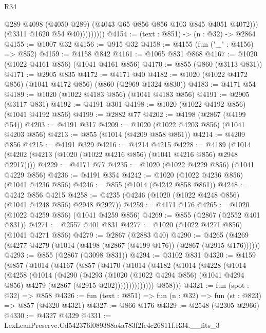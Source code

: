 \begin{lexlean}{R34}
\begin{coremodule}
                        @289
                        @4098
                        (@4050 @289)
                        (@4043 @65 @856 @856 @103 @845 @4051 @4072)))
                    (@3311 @1620 @54 @40)))))))))
@4154 := (text : @851) -> (n : @32) -> @2864
@4155 := @1007 @32
@4156 := @915 @32
@4158 := @4155 (fun ("_" : @4156) => @852)
@4159 := @4158 @842
@4161 := @1065 @831 @868
@4167 := @1020 (@1022 @4161 @856) (@1041 @4161 @856)
@4170 := @855 (@860 (@3113 @831))
@4171 := @2905 @835
@4172 := @4171 @40
@4182 := @1020 (@1022 @4172 @856) (@1041 @4172 @856) (@860 (@2969 @1324 @830))
@4183 := @4171 @54
@4189 := @1020 (@1022 @4183 @856) (@1041 @4183 @856)
@4191 := @2905 (@3117 @831)
@4192 := @4191 @301
@4198 := @1020 (@1022 @4192 @856) (@1041 @4192 @856)
@4199 := @2882 @77
@4202 := @4198 (@2867 (@4199 @54))
@4203 := @4191 @317
@4209 := @1020 (@1022 @4203 @856) (@1041 @4203 @856)
@4213 := @855 (@1014 (@4209 @858 @861))
@4214 := @4209 @856
@4215 := @4191 @329
@4216 := @4214 @4215
@4228 := @4189 (@1014 (@4202 (@4213 (@1020 (@1022 @4216 @856) (@1041 @4216 @856) @2948 @2917))))
@4229 := @4171 @77
@4235 := @1020 (@1022 @4229 @856) (@1041 @4229 @856)
@4236 := @4191 @354
@4242 := @1020 (@1022 @4236 @856) (@1041 @4236 @856)
@4246 := @855 (@1014 (@4242 @858 @861))
@4248 := @4242 @856 @4215
@4258 := @4235 (@4246 (@1020 (@1022 @4248 @856) (@1041 @4248 @856) @2948 @2927))
@4259 := @4171 @176
@4265 := @1020 (@1022 @4259 @856) (@1041 @4259 @856)
@4269 := @855 (@2867 (@2552 @401 @831))
@4271 := @2557 @401 @831
@4277 := @1020 (@1022 @4271 @856) (@1041 @4271 @856)
@4279 := @2867 (@2883 @40)
@4290 := @4265 (@4269 (@4277 @4279 (@1014 (@4198 (@2867 (@4199 @176)) (@2867 (@2915 @176))))))
@4293 := @855 (@2867 (@3098 @831))
@4294 := @3102 @831
@4320 := @4159
    (@857
      (@1014
        (@4167
          (@857
            (@4170
              (@1014
                (@4182
                  (@1014
                    (@4228
                      (@1014
                        (@4258
                          (@1014
                            (@4290
                              (@4293
                                (@1020
                                  (@1022 @4294 @856)
                                  (@1041 @4294 @856)
                                  @4279
                                  (@2867 (@2915 @202))))))))))))))
          @858)))
@4321 := fun (spot : @32) => @858
@4326 := fun (text : @851) => fun (n : @32) => fun (st : @823) => @857 (@4320 @4321)
@4327 := @866 @176
@4329 := @2548 (@2305 @2966)
@4330 := @4327 @4329
@4331 := LexLeanPreserve.Cd542376f089388a4a783f2fc4c26811f.R34.__fits_3

\end{coremodule}
\end{lexlean}
